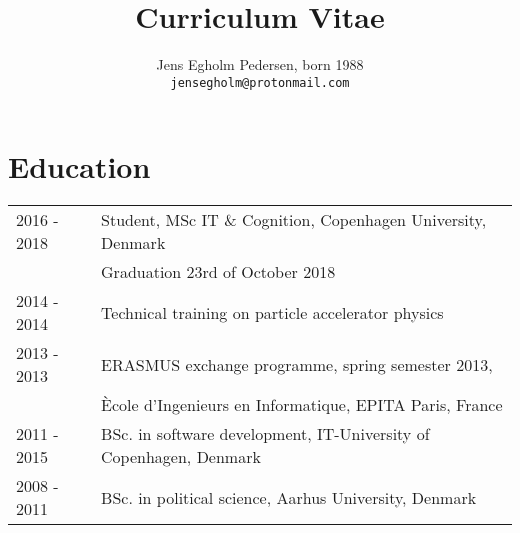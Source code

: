 \documentclass[12pt,a4paper,notitlepage]{article}
\author{Jens Egholm Pedersen, born 1988
\\ \texttt{jensegholm@protonmail.com}
}
\title{Curriculum Vitae}
\begin{document}
\maketitle

\section*{Education}
\begin{tabularx}{\textwidth}{l X}
2016 - 2018 & Student, MSc IT \& Cognition, Copenhagen University, Denmark \\
            & \footnotesize Graduation 23rd of October 2018 \\
2014 - 2014 & Technical training on particle accelerator physics \\
2013 - 2013 & ERASMUS exchange programme, spring semester 2013, \\
            & Ècole d'Ingenieurs en Informatique, EPITA Paris, France \\
2011 - 2015 & BSc. in software development, IT-University of Copenhagen, Denmark \\
2008 - 2011 & BSc. in political science, Aarhus University, Denmark
\end{tabularx}
\end{document}
